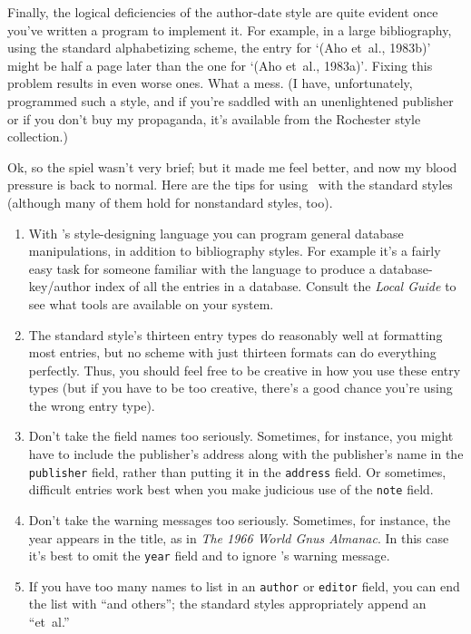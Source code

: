 Finally, the logical deficiencies of the author-date style
are quite evident once you've written a program to implement it.
For example, in a large bibliography,
using the standard alphabetizing scheme,
the entry for `(Aho et~al., 1983b)'
might be half a page later than the one for `(Aho et~al., 1983a)'$\!$.
Fixing this problem results in even worse ones.
What a mess.
(I have, unfortunately, programmed such a style,
and if you're saddled with an unenlightened publisher
or if you don't buy my propaganda,
it's available from the Rochester style collection.)

Ok, so the spiel wasn't very brief;
but it made me feel better,
and now my blood pressure is back to normal.
Here are the tips for using \BibTeX\
with the standard styles
(although many of them hold for nonstandard styles, too).
\begin{enumerate}

\item
With \BibTeX's style-designing language
you can program general database manipulations,
in addition to bibliography styles.
For example it's a fairly easy task for someone familiar with the language
to produce a database-key/author index of all the entries in a database.
Consult the {\em Local Guide\/} to see
what tools are available on your system.

\item
The standard style's thirteen entry types
do reasonably well at formatting most entries,
but no scheme with just thirteen formats
can do everything perfectly.
Thus, you should feel free to be creative
in how you use these entry types
(but if you have to be too creative,
there's a good chance you're using the wrong entry type).

\item
Don't take the field names too seriously.
Sometimes, for instance, you might have to include
the publisher's address along with the publisher's name
in the \hbox{\tt publisher} field,
rather than putting it in the \hbox{\tt address} field.
Or sometimes, difficult entries work best when you
make judicious use of the {\tt note} field.

\item
Don't take the warning messages too seriously.
Sometimes, for instance, the year appears in the title,
as in {\em The 1966 World Gnus Almanac}.
In this case it's best to omit the {\tt year} field
and to ignore \BibTeX's warning message.

\item
If you have too many names to list in an
\hbox{\tt author} or \hbox{\tt editor} field,
you can end the list with ``and others'';
the standard styles appropriately append an ``et~al.''


\end{enumerate}
